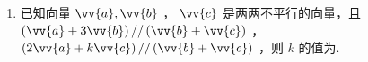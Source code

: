 \begin{enumerate}
\begin{jieda}
        所以 $\vv{AC} = \vv{AB} + \vv{BC} =  - 2{\vv{e}}_{1} + \left( {\lambda  - 1}\right) {\vv{e}}_{2} - 4{\vv{e}}_{3}$ .

        因为 $A,C,D$ 三点共线,所以存在唯一的实数 $y$ ,使得 $\vv{CD} = y\vv{AC}$ ,

        即 $4{\vv{e}}_{1} + 2{\vv{e}}_{2} + 8{\vv{e}}_{3} = y\left\lbrack  {-2{\vv{e}}_{1} + \left( {\lambda  - 1}\right) {\vv{e}}_{2} - 4{\vv{e}}_{3}}\right\rbrack$，即 $\left\{  \begin{array}{l} 4 =  - {2y} \\  2 = y\left( {\lambda  - 1}\right) \\  8 =  - {4y} \end{array}\right.$ ,解得 $\left\{  \begin{array}{l} \lambda  = 0 \\  y =  - 2 \end{array}\right.$.
    \end{jieda}
    
    \item 已知向量 $\vv{a},\vv{b}$ ， $\vv{c}$ 是两两不平行的向量，且 $\left( {\vv{a} + 3\vv{b}}\right) //\left( {\vv{b} + \vv{c}}\right)$ ， $\left( {2\vv{a} + k\vv{c}}\right) //\left( {\vv{b} + \vv{c}}\right)$ ，则 $k$ 的值为.
\end{enumerate}
